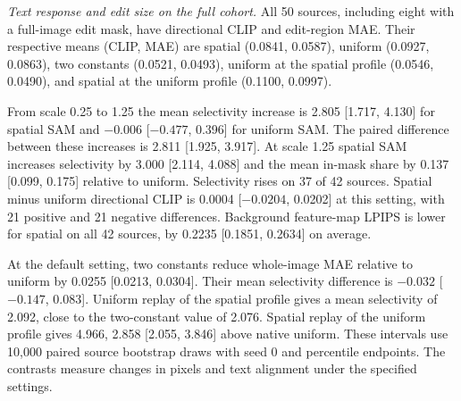 \noindent\textit{Text response and edit size on the full cohort.} All 50 sources, including eight with a full-image edit mask, have directional CLIP and edit-region MAE. Their respective means (CLIP, MAE) are spatial (0.0841, 0.0587), uniform (0.0927, 0.0863), two constants (0.0521, 0.0493), uniform at the spatial profile (0.0546, 0.0490), and spatial at the uniform profile (0.1100, 0.0997).

From scale 0.25 to 1.25 the mean selectivity increase is 2.805 [1.717, 4.130]
for spatial SAM and $-0.006$ [$-0.477$, 0.396] for uniform SAM. The paired
difference between these increases is 2.811 [1.925, 3.917]. At scale 1.25
spatial SAM increases selectivity by 3.000 [2.114, 4.088] and the mean
in-mask share by 0.137 [0.099, 0.175] relative to uniform. Selectivity rises
on 37 of 42 sources. Spatial minus uniform directional CLIP is 0.0004
[$-0.0204$, 0.0202] at this setting, with 21 positive and 21 negative
differences. Background feature-map LPIPS is lower for spatial on all 42
sources, by 0.2235 [0.1851, 0.2634] on average.

At the default setting, two constants reduce whole-image MAE relative to
uniform by 0.0255 [0.0213, 0.0304]. Their mean selectivity difference is
$-0.032$ [$-0.147$, 0.083]. Uniform replay of the spatial profile gives
a mean selectivity of 2.092, close to the two-constant value of 2.076.
Spatial replay of the uniform profile gives 4.966, 2.858 [2.055, 3.846]
above native uniform. These intervals use 10,000 paired source bootstrap
draws with seed 0 and percentile endpoints. The contrasts measure changes
in pixels and text alignment under the specified settings.

